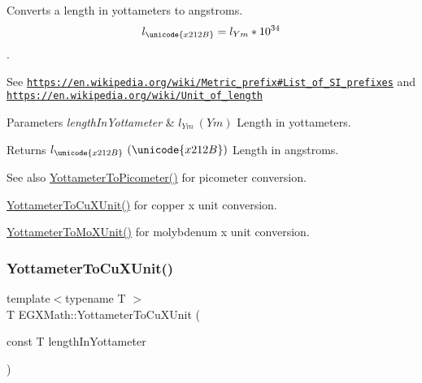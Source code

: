 Converts a length in yottameters to angstroms. \[ l_{\unicode{x212B}}=l_{Ym} * 10^{34} \]. 

See \href{https://en.wikipedia.org/wiki/Metric_prefix#List_of_SI_prefixes}{\tt https\+://en.\+wikipedia.\+org/wiki/\+Metric\+\_\+prefix\#\+List\+\_\+of\+\_\+\+S\+I\+\_\+prefixes} and \href{https://en.wikipedia.org/wiki/Unit_of_length}{\tt https\+://en.\+wikipedia.\+org/wiki/\+Unit\+\_\+of\+\_\+length} 
\begin{DoxyParams}{Parameters}
{\em length\+In\+Yottameter} & $ l_{Ym}\ (Ym)$ Length in yottameters. \\
\hline
\end{DoxyParams}
\begin{DoxyReturn}{Returns}
$ l_{\unicode{x212B}}\ (\unicode{x212B})$ Length in angstroms. 
\end{DoxyReturn}
\begin{DoxySeeAlso}{See also}
\mbox{\hyperlink{group___e_g_x_math-_conversions-_length_conversions-_s_i-_yottameter-_s_i_ga7af9d1314de06921546f079641c033b2}{Yottameter\+To\+Picometer()}} for picometer conversion. 

\mbox{\hyperlink{group___e_g_x_math-_conversions-_length_conversions-_s_i-_yottameter-_non-_s_i_ga5c8a9868ad238225dbf8ebdbfad13930}{Yottameter\+To\+Cu\+X\+Unit()}} for copper x unit conversion. 

\mbox{\hyperlink{group___e_g_x_math-_conversions-_length_conversions-_s_i-_yottameter-_non-_s_i_ga545da9526f7a62f5ca7d1800faf17d1d}{Yottameter\+To\+Mo\+X\+Unit()}} for molybdenum x unit conversion. 
\end{DoxySeeAlso}
\mbox{\label{group___e_g_x_math-_conversions-_length_conversions-_s_i-_yottameter-_non-_s_i_ga5c8a9868ad238225dbf8ebdbfad13930}} 
\subsubsection{\texorpdfstring{Yottameter\+To\+Cu\+X\+Unit()}{YottameterToCuXUnit()}}
{\footnotesize\ttfamily template$<$typename T $>$ \\
T E\+G\+X\+Math\+::\+Yottameter\+To\+Cu\+X\+Unit (\begin{DoxyParamCaption}\item[{const T}]{length\+In\+Yottameter }\end{DoxyParamCaption})}



